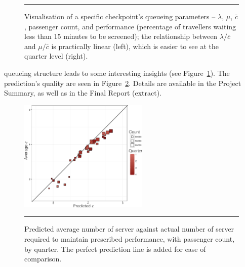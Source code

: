 \begin{figure}[!t]
\caption[\small Visualisation of a checkpoint's queueing parameters]{\small Visualisation of a specific checkpoint's queueing parameters -- $\lambda$, $\mu$, $\bar{c}$, passenger count, and performance (percentage of travellers waiting less than 15 minutes to be screened); the relationship between $\lambda/\bar{c}$ and $\mu/\bar{c}$ is practically linear (left), which is easier to see at the quarter level (right).}\label{fig:checkpoint}\hrule
\end{figure}\afterpage{\FloatBarrier}
 queueing structure leads to some interesting insights  (see Figure~\ref{fig:checkpoint}). The prediction's quality are seen in Figure~\ref{fig:predsCATSA}. Details are available in the Project Summary, as well as in the Final Report (extract). 
\newpage\noindent
\begin{figure}[H]
\centering
\includegraphics[width=0.55\textwidth]{Images/CATSA4.png}  
\caption[\small Predicted number of servers]{\small Predicted average number of server against actual number of server required to maintain prescribed performance, with passenger count, by quarter. The perfect prediction line is added for ease of comparison.}\label{fig:predsCATSA}\hrule
\end{figure}\afterpage{\FloatBarrier}
